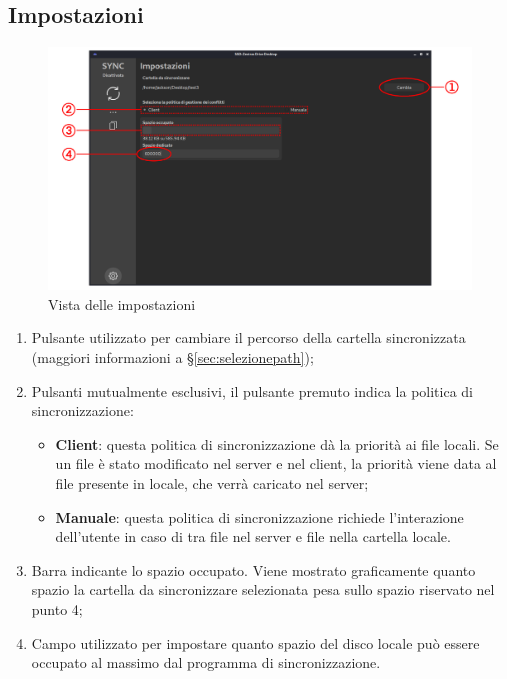 \subsection{Impostazioni} \label{sec:impostazioni}
\begin{figure}[H]
    \centering
    \includegraphics[scale = 0.30]{components/img/settings.png}
    \caption{Vista delle impostazioni}
    \label{fig:Vista delle impostazioni}
\end{figure}
\begin{enumerate}
	\item Pulsante utilizzato per cambiare il percorso della cartella sincronizzata (maggiori informazioni a \S{}\ref{sec:selezionepath});
	\item Pulsanti mutualmente esclusivi, il pulsante premuto indica la politica di sincronizzazione:
	\begin{itemize}
		\item \textbf{Client}: questa politica di sincronizzazione dà la priorità ai file locali. Se un file è stato modificato nel server e nel client, la priorità viene data al file presente in locale, che verrà caricato nel server;
		\item \textbf{Manuale}: questa politica di sincronizzazione richiede l'interazione dell'utente in caso di  tra file nel server e file nella cartella locale.
	\end{itemize}
	\item Barra indicante lo spazio occupato. Viene mostrato graficamente quanto spazio la cartella da sincronizzare selezionata pesa sullo spazio riservato nel punto 4;
	\item Campo utilizzato per impostare quanto spazio del disco locale può essere occupato al massimo dal programma di sincronizzazione.
\end{enumerate}